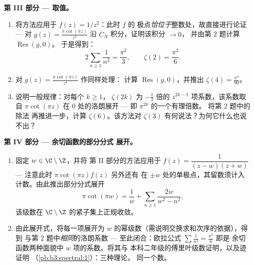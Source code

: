 \begin{problem}
\medskip
\noindent\textbf{第 III 部分 --- 取值。}
\begin{enumerate}[resume]
  \item 将方法应用于 $f(z) = 1/z^2$：此时 $f$ 的
        极点\emph{恰位于}整数处，故直接进行论证
        --- 对 $g(z) = \frac{\pi\cot(\pi
        z)}{z^2}$ 沿 $C_N$ 积分，证明该积分 $\to 0$，
        并由第 2 题计算 $\operatorname{Res}(g, 0)$。
        于是得到：
        \[
        2\sum_{n\geq1}\frac1{n^2} = \frac{\pi^2}{3},
        \qquad \zeta(2) = \frac{\pi^2}6 .
        \]
  \item 对 $g(z) = \frac{\pi\cot(\pi z)}{z^4}$ 作同样处理：
        计算 $\operatorname{Res}(g, 0)$，并推出
        $\zeta(4) = \frac{\pi^4}{90}$。
  \item 说明一般规律：对每个 $k \geq 1$，
        $\zeta(2k)$ 为 $-\frac12$ 倍的
        $z^{2k-1}$ 项系数，该系数取自 $\pi\cot(\pi
        z)$ 在 $0$ 处的洛朗展开 --- 即 $\pi^{2k}$ 的一个有理倍数。
        将第 2 题中的除法
        再推进一步，计算 $\zeta(6)$。该方法对
        $\zeta(3)$ 有何说法？为何它什么也说不出？
\end{enumerate}

\medskip
\noindent\textbf{第 IV 部分 --- 余切函数的部分分式
展开。}
\begin{enumerate}[resume]
  \item 固定 $w \in \C\setminus\Z$，并将
        第 II 部分的方法应用于 $f(z) = \dfrac{1}{(z - w)(z + w)}$ ---
        注意此时 $\pi\cot(\pi z)f(z)$ 另外还有
        在 $\pm w$ 处的单极点，其留数须计入
        计数。由此推出部分分式展开
        \[
        \pi\cot(\pi w) = \frac1w +
        \sum_{n\geq1}\frac{2w}{w^2 - n^2},
        \]
        该级数在
        $\C\setminus\Z$ 的紧子集上正规收敛。
  \item 由此展开式，将每一项展开为
        $w$ 的幂级数（需说明交换求和次序的依据），得到
        与第 2 题中\emph{相同}的洛朗系数 ---
        至此闭合：欧拉公式
        $\sum\frac1{n^2} = \frac{\pi^2}6$ 即是
        余切函数两种面貌中 $w$ 项的系数。将其与
        本科二年级的傅里叶级数证明，以及迹证明
        （\cref{pb:b3:spectral:1}）：三种理论，
        同一个数。
\end{enumerate}


\end{problem}
